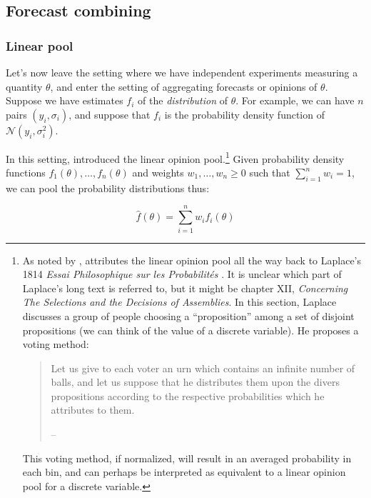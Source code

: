 \documentclass[letterpaper,12pt]{article}
\begin{document}

\subsection{Forecast combining}

\subsubsection{Linear pool}

Let's now leave the setting where we have independent experiments measuring a quantity $\theta$, and enter the setting of aggregating forecasts or opinions of $\theta$. Suppose we have estimates $f_i$ of the \emph{distribution} of $\theta$. For example, we can have $n$ pairs $(y_i,\sigma_i)$, and suppose that $f_i$ is the probability density function of $\mathcal{N}(y_i,\sigma_i^2)$.

In this setting, \cite{stone1961opinion} introduced the linear opinion pool.\footnote{As noted by \cite{koepke2017consensus}, \cite{bacharach1979normal} attributes the linear opinion pool all the way back to Laplace's 1814 \emph{Essai Philosophique sur les Probabilités} \citep{laplace1951essay}. It is unclear which part of Laplace's long text is referred to, but it might be chapter XII, \emph{Concerning The Selections and the Decisions of Assemblies}. In this section, Laplace discusses a group of people choosing a ``proposition'' among a set of disjoint propositions (we can think of the value of a discrete variable). He proposes a voting method:
  \begin{quote}Let us give to each voter an urn which contains an infinite number of balls, and let us suppose that he distributes them upon the divers propositions according to the respective probabilities which he attributes to them.

  \hfill -- \citet[pg. 130]{laplace1951essay}\end{quote}

  \noindent This voting method, if normalized, will result in an averaged probability in each bin, and can perhaps be interpreted as equivalent to a linear opinion pool for a discrete variable.} Given probability density functions $f_1(\theta),\ldots,f_n(\theta)$ and weights $w_1,\ldots,w_n\geq 0$ such that $\sum_{i=1}^n w_i=1$, we can pool the probability distributions thus:

\[\hat f(\theta)=\sum_{i=1}^n w_if_i(\theta)\]
\end{document}
